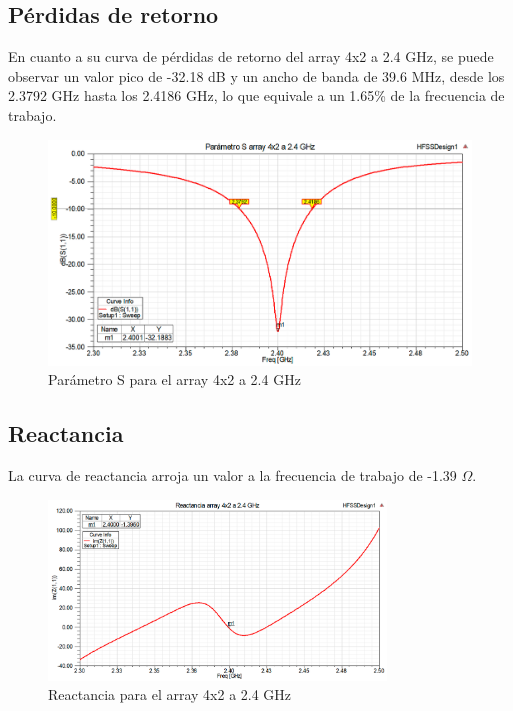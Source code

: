 \subsection{Pérdidas de retorno}
\par En cuanto a su curva de pérdidas de retorno del array 4x2 a 2.4 GHz, se puede observar un valor pico de -32.18 dB y un ancho de banda de 39.6 MHz, desde los 2.3792 GHz hasta los 2.4186 GHz, lo que equivale a un 1.65\% de la frecuencia de trabajo.
\\
\begin{figure}[H]
    \centering
        \includegraphics[width=\textwidth]{archivos/analisis/4x21/1}
        \caption{Parámetro S para el array 4x2 a 2.4 GHz}
        \label{fig:s4x21}
\end{figure}

\newpage
\subsection{Reactancia}
\par La curva de reactancia arroja un valor a la frecuencia de trabajo de -1.39 $\Omega$. 
\\
\begin{figure}[H]
    \centering
        \includegraphics[width=0.8\textwidth]{archivos/analisis/4x21/2}
        \caption{Reactancia para el array 4x2 a 2.4 GHz}
        \label{fig:react4x21}
\end{figure}

